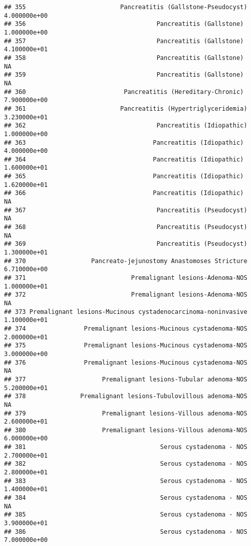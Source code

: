 \documentclass[
]{article}
\begin{document}
\begin{verbatim}
## 355                          Pancreatitis (Gallstone-Pseudocyst)  4.000000e+00
## 356                                    Pancreatitis (Gallstone)   1.000000e+00
## 357                                    Pancreatitis (Gallstone)   4.100000e+01
## 358                                    Pancreatitis (Gallstone)             NA
## 359                                    Pancreatitis (Gallstone)             NA
## 360                           Pancreatitis (Hereditary-Chronic)   7.900000e+00
## 361                          Pancreatitis (Hypertriglyceridemia)  3.230000e+01
## 362                                    Pancreatitis (Idiopathic)  1.000000e+00
## 363                                   Pancreatitis (Idiopathic)   4.000000e+00
## 364                                   Pancreatitis (Idiopathic)   1.600000e+01
## 365                                   Pancreatitis (Idiopathic)   1.620000e+01
## 366                                   Pancreatitis (Idiopathic)             NA
## 367                                    Pancreatitis (Pseudocyst)            NA
## 368                                    Pancreatitis (Pseudocyst)            NA
## 369                                    Pancreatitis (Pseudocyst)  1.300000e+01
## 370                  Pancreato-jejunostomy Anastomoses Stricture  6.710000e+00
## 371                             Premalignant lesions-Adenoma-NOS  1.000000e+01
## 372                             Premalignant lesions-Adenoma-NOS            NA
## 373 Premalignant lesions-Mucinous cystadenocarcinoma-noninvasive  1.100000e+01
## 374                Premalignant lesions-Mucinous cystadenoma-NOS  2.000000e+01
## 375                Premalignant lesions-Mucinous cystadenoma-NOS  3.000000e+00
## 376                Premalignant lesions-Mucinous cystadenoma-NOS            NA
## 377                     Premalignant lesions-Tubular adenoma-NOS  5.200000e+01
## 378               Premalignant lesions-Tubulovillous adenoma-NOS            NA
## 379                     Premalignant lesions-Villous adenoma-NOS  2.600000e+01
## 380                     Premalignant lesions-Villous adenoma-NOS  6.000000e+00
## 381                                     Serous cystadenoma - NOS  2.700000e+01
## 382                                     Serous cystadenoma - NOS  2.800000e+01
## 383                                     Serous cystadenoma - NOS  1.400000e+01
## 384                                     Serous cystadenoma - NOS            NA
## 385                                     Serous cystadenoma - NOS  3.900000e+01
## 386                                     Serous cystadenoma - NOS  7.000000e+00

\end{verbatim}
\end{document}
